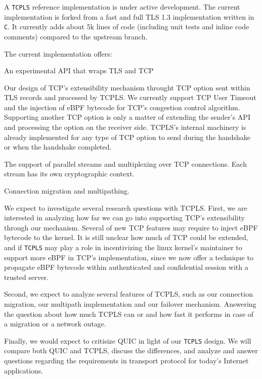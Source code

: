 
A \texttt{TCPLS} reference implementation is under active development. The
current implementation is forked from a fast and full
TLS 1.3 implementation written in \texttt{C}. It currently adds about 5k lines
of code (including unit tests and inline code comments) compared to the upstream branch.

The current implementation offers: 
\begin{inparaenum}
  \item An experimental API that wraps TLS and TCP
  \item Our design of TCP's extensibility mechanism throught TCP option sent
within TLS records and processed by TCPLS. We currently support TCP User
Timeout and the injection of eBPF bytecode for TCP's congestion control
algorithm. Supporting another TCP option is only a matter of extending the sender's
API and processing the option
on the receiver side. TCPLS's internal machinery is already implemented for any
type of TCP option to send during the handshake or when the handshake completed.
  \item The support of parallel streams and multiplexing over TCP connections.
    Each stream has its own cryptographic context.
  \item Connection migration and multipathing.
\end{inparaenum}

We expect to investigate several research questions with TCPLS. First, we are
interested in analyzing how far we can go into supporting TCP's extensibility
through our mechanism. Several of new TCP features may require to inject eBPF
bytecode to the kernel. It is still unclear how much of TCP could be extended,
and if \texttt{TCPLS} may play a role in incentivizing the linux kernel's maintainer
to support more eBPF in TCP's implementation, since we now offer a technique to
propagate eBPF bytecode within authenticated and confidential session with a
trusted server.

Second, we expect to analyze several features of TCPLS, such as our
connection migration, our multipath implementation and our failover mechanism.
Answering the question about how much TCPLS can or and how fast it performs in
case of a migration or a network outage.

Finally, we would expect to critisize QUIC in light of our \texttt{TCPLS}
design. We will compare both QUIC and TCPLS, discuss the differences, and analyze
and answer questions regarding the requirements in transport protocol for today's
Internet applications.



